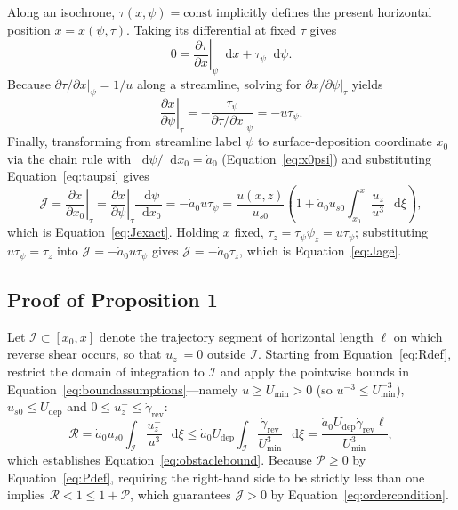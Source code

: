 \documentclass[review]{igs}
\begin{document}
Along an isochrone, \(\tau(x,\psi)=\text{const}\) implicitly defines the present horizontal position \(x=x(\psi,\tau)\). Taking its differential at fixed \(\tau\) gives
\begin{equation}
0=\left.\frac{\partial\tau}{\partial x}\right|_{\psi}\mathop{}\!\mathrm{d} x
+\tau_{\psi}\mathop{}\!\mathrm{d}\psi.
\end{equation}
Because \(\left.\partial\tau/\partial x\right|_{\psi}=1/u\) along a streamline, solving for \(\left.\partial x/\partial\psi\right|_{\tau}\) yields
\begin{equation}
\left.\frac{\partial x}{\partial\psi}\right|_{\tau}
=-\frac{\tau_{\psi}}{\left.\partial\tau/\partial x\right|_{\psi}}
=-u\tau_{\psi}.
\end{equation}
Finally, transforming from streamline label \(\psi\) to surface-deposition coordinate \(x_0\) via the chain rule with \(\mathop{}\!\mathrm{d}\psi/\mathop{}\!\mathrm{d} x_0=\dot a_0\) (Equation~\ref{eq:x0psi}) and substituting Equation~\ref{eq:taupsi} gives
\begin{equation}
\mathcal{J}
=\left.\frac{\partial x}{\partial x_0}\right|_{\tau}
=\left.\frac{\partial x}{\partial\psi}\right|_{\tau}\frac{\mathop{}\!\mathrm{d}\psi}{\mathop{}\!\mathrm{d} x_0}
=-\dot a_0 u\tau_{\psi}
=\frac{u(x,z)}{u_{s0}}
\left(
1+\dot a_0u_{s0}
\int_{x_0}^{x}\frac{u_z}{u^3}\,\mathop{}\!\mathrm{d}\xi
\right),
\end{equation}
which is Equation~\ref{eq:Jexact}. Holding \(x\) fixed, \(\tau_z=\tau_{\psi}\psi_z=u\tau_{\psi}\); substituting \(u\tau_{\psi}=\tau_z\) into \(\mathcal{J}=-\dot a_0 u\tau_{\psi}\) gives \(\mathcal{J}=-\dot a_0\tau_z\), which is Equation~\ref{eq:Jage}.

\subsection{Proof of Proposition 1}

Let \(\mathcal{I}\subset[x_0,x]\) denote the trajectory segment of horizontal length \(\ell\) on which reverse shear occurs, so that \(u_z^-=0\) outside \(\mathcal{I}\). Starting from Equation~\ref{eq:Rdef}, restrict the domain of integration to \(\mathcal{I}\) and apply the pointwise bounds in Equation~\ref{eq:boundassumptions}---namely \(u\geq U_{\min}>0\) (so \(u^{-3}\leq U_{\min}^{-3}\)), \(u_{s0}\leq U_{\mathrm{dep}}\) and \(0\leq u_z^-\leq\dot\gamma_{\mathrm{rev}}\):
\begin{equation}
\mathcal{R}
=\dot a_0u_{s0}\int_{\mathcal{I}}\frac{u_z^-}{u^3}\,\mathop{}\!\mathrm{d}\xi
\leq \dot a_0 U_{\mathrm{dep}}\int_{\mathcal{I}}\frac{\dot\gamma_{\mathrm{rev}}}{U_{\min}^{3}}\,\mathop{}\!\mathrm{d}\xi
=\frac{\dot a_0U_{\mathrm{dep}}\dot\gamma_{\mathrm{rev}}\ell}{U_{\min}^{3}},
\end{equation}
which establishes Equation~\ref{eq:obstaclebound}. Because \(\mathcal{P}\geq0\) by Equation~\ref{eq:Pdef}, requiring the right-hand side to be strictly less than one implies \(\mathcal{R}<1\leq 1+\mathcal{P}\), which guarantees \(\mathcal{J}>0\) by Equation~\ref{eq:ordercondition}.
\end{document}
